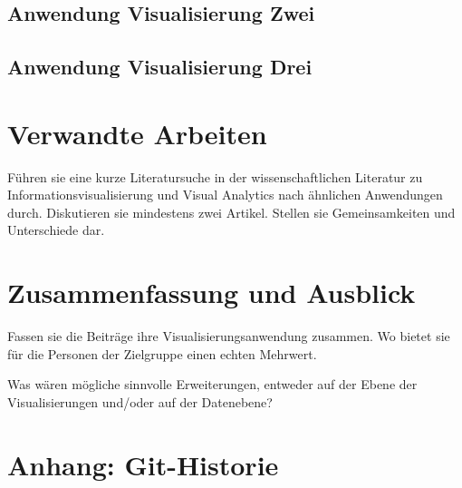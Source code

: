 \documentclass[usegeometry=true]{scrartcl}
\begin{document}
\subsection{Anwendung Visualisierung Zwei}
\subsection{Anwendung Visualisierung Drei}

\section{Verwandte Arbeiten}
Führen sie eine kurze Literatursuche in der wissenschaftlichen Literatur zu Informationsvisualisierung und Visual Analytics nach ähnlichen Anwendungen durch. Diskutieren sie mindestens zwei Artikel. Stellen sie Gemeinsamkeiten und Unterschiede dar.

\section{Zusammenfassung und Ausblick}
Fassen sie die Beiträge ihre Visualisierungsanwendung zusammen. Wo bietet sie für die Personen der Zielgruppe einen echten Mehrwert.

Was wären mögliche sinnvolle Erweiterungen, entweder auf der Ebene der Visualisierungen und/oder auf der Datenebene?

\section*{Anhang: Git-Historie}

\printbibliography
\end{document}
